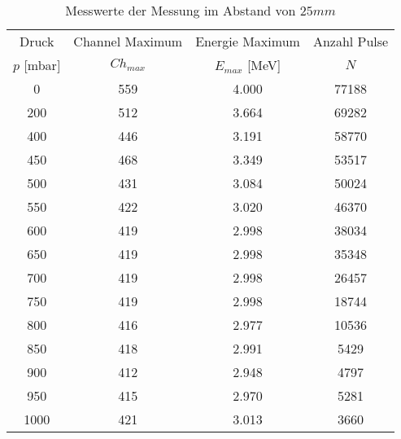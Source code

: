 \begin{table}[!h]
	\centering
	\begin{tabular}{|c|c|c|c|}
		\hline
		Druck & Channel Maximum & Energie Maximum & Anzahl Pulse\\
		$p$ [\si{\milli\bar}] & $Ch_{max}$ & $E_{max}$ [\si{\mega\eV}] & $N$\\
\hline\hline
		\num{0} & \num{559} & \num{4.000} & \num{77188}\\
		\num{200} & \num{512} & \num{3.664} & \num{69282}\\
		\num{400} & \num{446} & \num{3.191} & \num{58770}\\
		\num{450} & \num{468} & \num{3.349} & \num{53517}\\
		\num{500} & \num{431} & \num{3.084} & \num{50024}\\
		\num{550} & \num{422} & \num{3.020} & \num{46370}\\
		\num{600} & \num{419} & \num{2.998} & \num{38034}\\
		\num{650} & \num{419} & \num{2.998} & \num{35348}\\
		\num{700} & \num{419} & \num{2.998} & \num{26457}\\
		\num{750} & \num{419} & \num{2.998} & \num{18744}\\
		\num{800} & \num{416} & \num{2.977} & \num{10536}\\
		\num{850} & \num{418} & \num{2.991} & \num{5429}\\
		\num{900} & \num{412} & \num{2.948} & \num{4797}\\
		\num{950} & \num{415} & \num{2.970} & \num{5281}\\
		\num{1000} & \num{421} & \num{3.013} & \num{3660}\\
		\hline
	\end{tabular}
	\caption{Messwerte der Messung im Abstand von $25 \si{mm}$ \label{tab:Messwerte_II}}
\end{table}
